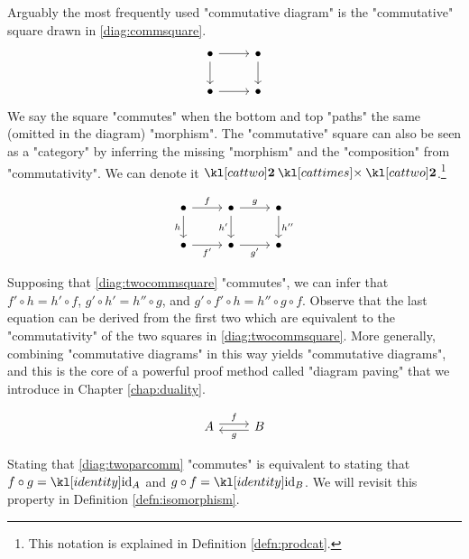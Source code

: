 \documentclass[main.tex]{subfiles}
\begin{document}
\begin{exmps}
	Arguably the most frequently used "commutative diagram" is the "commutative" square drawn in \eqref{diag:commsquare}.
	\begin{equation}\label{diag:commsquare}\begin{tikzcd}
		\bullet \arrow[r] \arrow[d] & \bullet \arrow[d] \\
		\bullet \arrow[r]           & \bullet          
	\end{tikzcd}\end{equation}
	We say the square "commutes" when the bottom and top "paths"  the same (omitted in the diagram) "morphism". The "commutative" square can also be seen as a "category" by inferring the missing "morphism" and the "composition" from "commutativity". We can denote it $\cattwo \cattimes \cattwo$.\footnote{This notation is explained in Definition \ref{defn:prodcat}.}
	\begin{marginfigure}\begin{equation}\label{diag:twocommsquare}
		\begin{tikzcd}
			\bullet & \bullet & \bullet \\
			\bullet & \bullet & \bullet
			\arrow["h"', from=1-1, to=2-1]
			\arrow["{f'}"', from=2-1, to=2-2]
			\arrow["f", from=1-1, to=1-2]
			\arrow["g", from=1-2, to=1-3]
			\arrow["{g'}"', from=2-2, to=2-3]
			\arrow["{h''}", from=1-3, to=2-3]
			\arrow["{h'}"', from=1-2, to=2-2]
		\end{tikzcd}
	\end{equation}\end{marginfigure}
	Supposing that \eqref{diag:twocommsquare} "commutes", we can infer that $f' \circ h = h' \circ f$, $g' \circ h' = h'' \circ g$, and $g' \circ f' \circ h = h'' \circ g \circ f$. Observe that the last equation can be derived from the first two which are equivalent to the "commutativity" of the two squares in \eqref{diag:twocommsquare}. More generally, combining "commutative diagrams" in this way yields "commutative diagrams", and this is the core of a powerful proof method called "diagram paving" that we introduce in Chapter \ref{chap:duality}.
	\begin{marginfigure}\begin{equation}\label{diag:twoparcomm}
		\begin{tikzcd}
			A & B
			\arrow["f", shift left=1, from=1-1, to=1-2]
			\arrow["g", shift left=1, from=1-2, to=1-1]
		\end{tikzcd}
	\end{equation}\end{marginfigure}
	Stating that \eqref{diag:twoparcomm} "commutes" is equivalent to stating that $f \circ g = \id_A$ and $g \circ f = \id_B$. We will revisit this property in Definition \ref{defn:isomorphism}.
	

\end{exmps}
\end{document}
